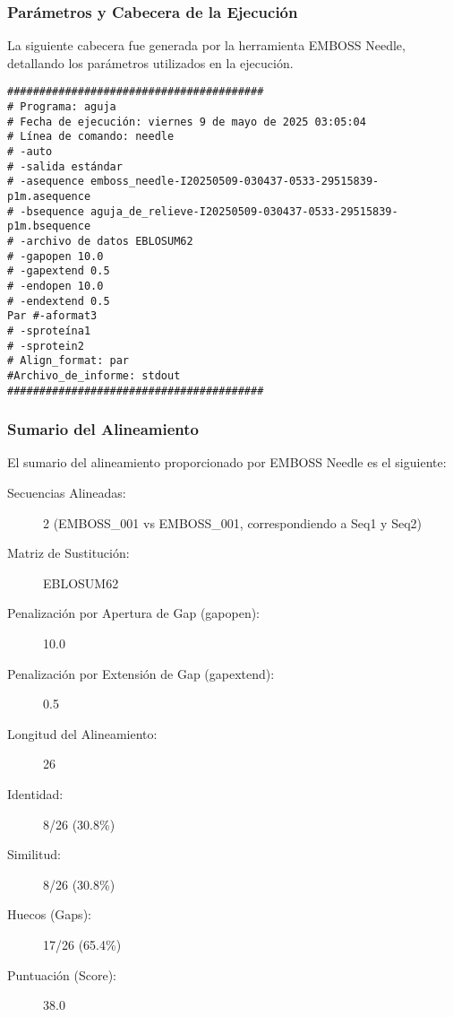 \documentclass[fleqn,10pt]{article}
\begin{document}
\subsubsection*{Parámetros y Cabecera de la Ejecución}
La siguiente cabecera fue generada por la herramienta EMBOSS Needle, detallando los parámetros utilizados en la ejecución.
\begin{lstlisting}[style=outputstyle, caption={Cabecera del resultado de EMBOSS Needle (ejemplo Seq1 vs Seq2)}, basicstyle=\ttfamily\tiny, columns=flexible]
########################################
# Programa: aguja
# Fecha de ejecución: viernes 9 de mayo de 2025 03:05:04
# Línea de comando: needle
# -auto
# -salida estándar
# -asequence emboss_needle-I20250509-030437-0533-29515839-p1m.asequence
# -bsequence aguja_de_relieve-I20250509-030437-0533-29515839-p1m.bsequence
# -archivo de datos EBLOSUM62
# -gapopen 10.0
# -gapextend 0.5
# -endopen 10.0
# -endextend 0.5
Par #-aformat3
# -sproteína1
# -sprotein2
# Align_format: par
#Archivo_de_informe: stdout
########################################
\end{lstlisting}

\subsubsection*{Sumario del Alineamiento}
El sumario del alineamiento proporcionado por EMBOSS Needle es el siguiente:
\begin{description}
    \item[Secuencias Alineadas:] 2 (EMBOSS\_001 vs EMBOSS\_001, correspondiendo a Seq1 y Seq2)
    \item[Matriz de Sustitución:] EBLOSUM62
    \item[Penalización por Apertura de Gap (gapopen):] 10.0
    \item[Penalización por Extensión de Gap (gapextend):] 0.5
    \item[Longitud del Alineamiento:] 26
    \item[Identidad:] 8/26 (30.8\%)
    \item[Similitud:] 8/26 (30.8\%)
    \item[Huecos (Gaps):] 17/26 (65.4\%)
    \item[Puntuación (Score):] 38.0
\end{description}
\end{document}
